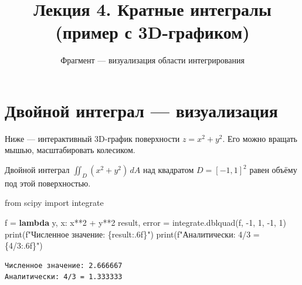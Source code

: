 \documentclass[
  russian,
  12pt,
  a4paper,
]{article}
\title{Лекция 4. Кратные интегралы (пример с 3D-графиком)}
\subtitle{Фрагмент --- визуализация области интегрирования}
\author{}
\date{}
\newenvironment{Shaded}{\begin{snugshade}}{\end{snugshade}}
\newcommand{\BuiltInTok}[1]{\textcolor[rgb]{0.00,0.23,0.31}{#1}}
\newcommand{\DecValTok}[1]{\textcolor[rgb]{0.68,0.00,0.00}{#1}}
\newcommand{\ImportTok}[1]{\textcolor[rgb]{0.00,0.46,0.62}{#1}}
\newcommand{\KeywordTok}[1]{\textcolor[rgb]{0.00,0.23,0.31}{\textbf{#1}}}
\newcommand{\NormalTok}[1]{\textcolor[rgb]{0.00,0.23,0.31}{#1}}
\newcommand{\OperatorTok}[1]{\textcolor[rgb]{0.37,0.37,0.37}{#1}}
\newcommand{\SpecialCharTok}[1]{\textcolor[rgb]{0.37,0.37,0.37}{#1}}
\newcommand{\SpecialStringTok}[1]{\textcolor[rgb]{0.13,0.47,0.30}{#1}}
\theoremstyle{definition}
\theoremstyle{remark}
\renewcommand*\contentsname{Содержание}
\newcommand\contentsname{Содержание}
\begin{document}
\maketitle

\renewcommand*\contentsname{Содержание}
{
\setcounter{tocdepth}{3}
\tableofcontents
}

\section{Двойной интеграл ---
визуализация}\label{ux434ux432ux43eux439ux43dux43eux439-ux438ux43dux442ux435ux433ux440ux430ux43b-ux432ux438ux437ux443ux430ux43bux438ux437ux430ux446ux438ux44f}

Ниже --- интерактивный 3D-график поверхности \(z = x^2 + y^2\). Его
можно вращать мышью, масштабировать колесиком.

\begin{figure}


\caption{\label{fig-paraboloid}}

\end{figure}%

Двойной интеграл \(\displaystyle\iint_D (x^2 + y^2)\,dA\) над квадратом
\(D = [-1,1]^2\) равен объёму под этой поверхностью.

\protect{}\label{calc-integral}
\begin{Shaded}
\begin{Highlighting}[]
\ImportTok{from}\NormalTok{ scipy }\ImportTok{import}\NormalTok{ integrate}

\NormalTok{f }\OperatorTok{=} \KeywordTok{lambda}\NormalTok{ y, x: x}\OperatorTok{**}\DecValTok{2} \OperatorTok{+}\NormalTok{ y}\OperatorTok{**}\DecValTok{2}
\NormalTok{result, error }\OperatorTok{=}\NormalTok{ integrate.dblquad(f, }\OperatorTok{{-}}\DecValTok{1}\NormalTok{, }\DecValTok{1}\NormalTok{, }\OperatorTok{{-}}\DecValTok{1}\NormalTok{, }\DecValTok{1}\NormalTok{)}
\BuiltInTok{print}\NormalTok{(}\SpecialStringTok{f"Численное значение: }\SpecialCharTok{\{}\NormalTok{result}\SpecialCharTok{:.6f\}}\SpecialStringTok{"}\NormalTok{)}
\BuiltInTok{print}\NormalTok{(}\SpecialStringTok{f"Аналитически: 4/3 = }\SpecialCharTok{\{}\DecValTok{4}\OperatorTok{/}\DecValTok{3}\SpecialCharTok{:.6f\}}\SpecialStringTok{"}\NormalTok{)}
\end{Highlighting}
\end{Shaded}

\begin{verbatim}
Численное значение: 2.666667
Аналитически: 4/3 = 1.333333
\end{verbatim}
\end{document}
